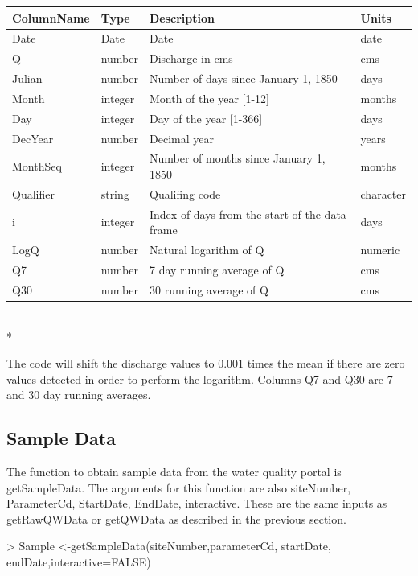 \documentclass[a4paper,11pt]{article}
\begin{document}
\begin{tabular}{llll}
  \hline
ColumnName & Type & Description & Units \\ 
  \hline
Date & Date & Date & date \\ 
  Q & number & Discharge in cms & cms \\ 
  Julian & number & Number of days since January 1, 1850 & days \\ 
  Month & integer & Month of the year [1-12] & months \\ 
  Day & integer & Day of the year [1-366] & days \\ 
  DecYear & number & Decimal year & years \\ 
  MonthSeq & integer & Number of months since January 1, 1850 & months \\ 
  Qualifier & string & Qualifing code & character \\ 
  i & integer & Index of days from the start of the data frame & days \\ 
  LogQ & number & Natural logarithm of Q & numeric \\ 
  Q7 & number & 7 day running average of Q & cms \\ 
  Q30 & number & 30 running average of Q & cms \\ 
   \hline
\end{tabular}\\*

The code will shift the discharge values to 0.001 times the mean if there are zero values detected in order to perform the logarithm. Columns Q7 and Q30 are 7 and 30 day running averages. 

\subsection{Sample Data}
The function to obtain sample data from the water quality portal is getSampleData. The arguments for this function are also siteNumber, ParameterCd, StartDate, EndDate, interactive. These are the same inputs as getRawQWData or getQWData as described in the previous section.

\begin{Schunk}
\begin{Sinput}
> Sample <-getSampleData(siteNumber,parameterCd,
       startDate, endDate,interactive=FALSE)
\end{Sinput}
\end{Schunk}
\end{document}
